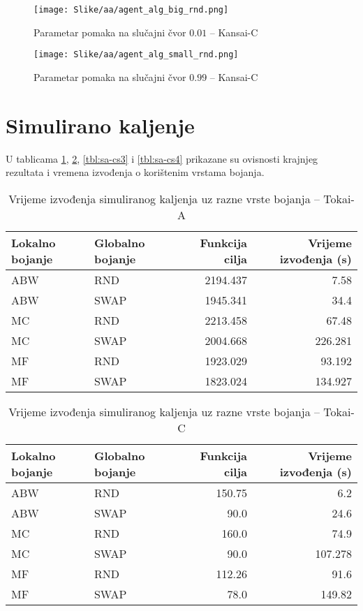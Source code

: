 \documentclass[times, utf8, diplomski, numeric]{fer}
\begin{document}
\begin{figure}[htb]
	\texttt{[image: Slike/aa/agent\_alg\_big\_rnd.png]}
	\caption{Parametar pomaka na slučajni čvor $0.01$ -- Kansai-C}
	\label{fig:agent_alg_big_rnd}
\end{figure}

\begin{figure}[htb]
	\texttt{[image: Slike/aa/agent\_alg\_small\_rnd.png]}
	\caption{Parametar pomaka na slučajni čvor $0.99$ -- Kansai-C}
	\label{fig:agent_alg_small_rnd}
\end{figure}

\clearpage

\section{Simulirano kaljenje}

U tablicama \ref{tbl:sa-cs1}, \ref{tbl:sa-cs2}, \ref{tbl:sa-cs3} i \ref{tbl:sa-cs4} prikazane su ovisnosti krajnjeg rezultata i vremena izvođenja o korištenim vrstama bojanja. 

\begin{table}[htb]
	\caption{Vrijeme izvođenja simuliranog kaljenja uz razne vrste bojanja -- Tokai-A}
	\label{tbl:sa-cs1}
	\centering
	\begin{tabular}{|l||l|r|r|} \hline
	Lokalno bojanje & Globalno bojanje & Funkcija cilja & Vrijeme izvođenja (s)\\ \hline \hline
	ABW & RND & 2194.437 & 7.58 \\ \hline 
	ABW & SWAP & 1945.341 & 34.4 \\  \hline
	MC & RND & 2213.458 & 67.48 \\ \hline
	MC & SWAP & 2004.668 & 226.281 \\  \hline 
	MF & RND & 1923.029 & 93.192 \\ \hline
	MF & SWAP & 1823.024 & 134.927 \\ \hline
	\end{tabular}
\end{table}

\begin{table}[htb]
	\caption{Vrijeme izvođenja simuliranog kaljenja uz razne vrste bojanja -- Tokai-C}
	\label{tbl:sa-cs2}
	\centering
	\begin{tabular}{|l||l|r|r|} \hline
	Lokalno bojanje & Globalno bojanje & Funkcija cilja & Vrijeme izvođenja (s)\\ \hline \hline
	ABW & RND & 150.75 & 6.2 \\ \hline 
	ABW & SWAP & 90.0 & 24.6 \\  \hline
	MC & RND & 160.0 & 74.9 \\ \hline
	MC & SWAP & 90.0 & 107.278 \\  \hline 
	MF & RND & 112.26 & 91.6 \\ \hline
	MF & SWAP & 78.0 & 149.82 \\ \hline
	\end{tabular}
\end{table}
\end{document}
